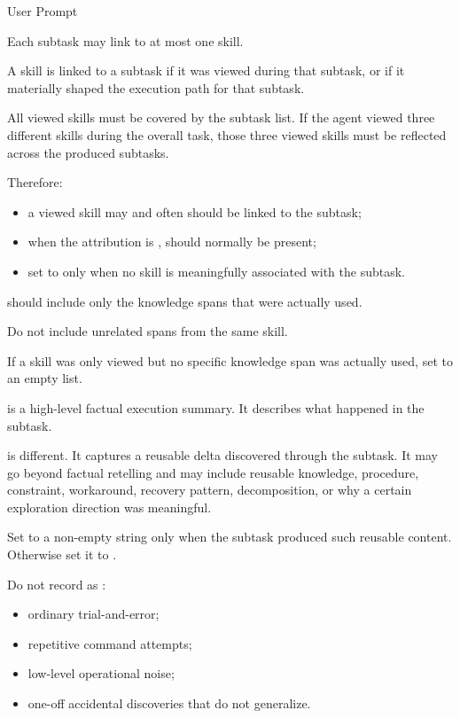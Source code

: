 \begin{svpromptbox}{User Prompt}
\begin{itemize}
\end{itemize}
\smallskip
{}
\smallskip
Each subtask may link to at most one skill.\par
\smallskip
A skill is linked to a subtask if it was viewed during that subtask, or if it materially shaped the execution path for that subtask.\par
\smallskip
All viewed skills must be covered by the subtask list. If the agent viewed three different skills during the overall task, those three viewed skills must be reflected across the produced subtasks.\par
\smallskip
Therefore:\par
\smallskip
\begin{itemize}
\item a viewed skill may and often should be linked to the subtask;
\item when the attribution is ,  should normally be present;
\item set  to  only when no skill is meaningfully associated with the subtask.
\end{itemize}
\smallskip
{} should include only the knowledge spans that were actually used.\par
\smallskip
Do not include unrelated spans from the same skill.\par
\smallskip
If a skill was only viewed but no specific knowledge span was actually used, set  to an empty list.\par
\smallskip
{}
\smallskip
{} is a high-level factual execution summary. It describes what happened in the subtask.\par
\smallskip
{} is different. It captures a reusable delta discovered through the subtask. It may go beyond factual retelling and may include reusable knowledge, procedure, constraint, workaround, recovery pattern, decomposition, or why a certain exploration direction was meaningful.\par
\smallskip
Set  to a non-empty string only when the subtask produced such reusable content. Otherwise set it to .\par
\smallskip
Do not record as :\par
\smallskip
\begin{itemize}
\item ordinary trial-and-error;
\item repetitive command attempts;
\item low-level operational noise;
\item one-off accidental discoveries that do not generalize.
\end{itemize}

\end{svpromptbox}

